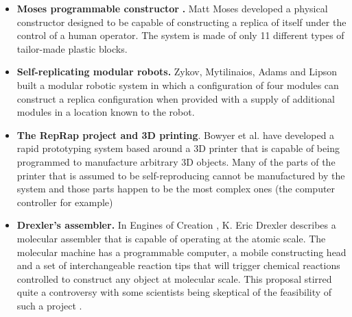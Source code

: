 \documentclass[letterpaper]{article}
\begin{document}
\bigskip

\begin{itemize}
\item \textbf{Moses{\textquotesingle} programmable constructor
}\textbf{.} Matt Moses developed a physical constructor designed to be
capable of constructing a replica of itself under the control of a
human operator. The system is made of only 11 different types of
tailor-made plastic blocks.
\end{itemize}

\bigskip

\begin{itemize}
\item \textbf{Self-replicating modular robots.  }Zykov, Mytilinaios,
Adams and Lipson built a modular robotic system in which a
configuration of four modules can construct a replica configuration
when provided with a supply of additional modules in a location known
to the robot.
\end{itemize}

\bigskip

\begin{itemize}
\item \textbf{The RepRap project and 3D printing}. Bowyer et al.  have
developed a rapid prototyping system based around a 3D printer that is
capable of being programmed to manufacture arbitrary 3D objects. Many
of the parts of the printer that is assumed to be self-reproducing
cannot be manufactured by the system and those parts happen to be the
most complex ones (the computer controller for example)
\end{itemize}

\bigskip

\begin{itemize}
\item \textbf{Drexler’s assembler.} In Engines of Creation , K. Eric
Drexler describes a molecular assembler that is capable of operating at
the atomic scale. The molecular machine has a programmable computer, a
mobile constructing head and a set of interchangeable reaction tips
that will trigger chemical reactions controlled to construct any object
at molecular scale. This proposal stirred quite a controversy with some
scientists being skeptical of the feasibility of such a project . 
\end{itemize}

\bigskip
\end{document}

